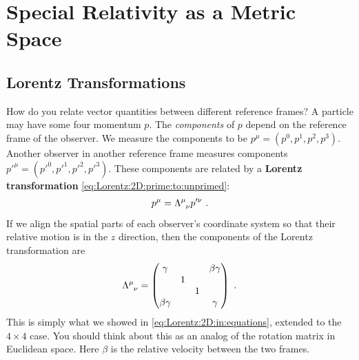 \documentclass[12pt, oneside]{report}    %
\let\oldsection\section
\def\section{%
  \setcounter{sidenote}{1}%
  \oldsection
}
\begin{document}
 




\chapter{Special Relativity as a Metric Space}

\section{Lorentz Transformations}\label{sec:Lorentz:transformations}

How do you relate vector quantities between different reference frames? A particle may have some four momentum $p$. The \emph{components} of $p$ depend on the reference frame of the observer. We measure the components to be $p^\mu = (p^0, p^1, p^2, p^3)$. Another observer in another reference frame measures components $p'^\mu=(p'^0, p'^1, p'^2, p'^3)$. These components are related by a \textbf{Lorentz transformation} \eqref{eq:Lorentz:2D:prime:to:unprimed}:
\begin{align}
    p^\mu = \Lambda\aij{\mu}{\nu}p'^\nu \ .
\end{align}
If we align the spatial parts of each observer's coordinate system so that their relative motion is in the $z$ direction, then the components of the Lorentz transformation are
\begin{align}
    \Lambda\aij{\mu}{\nu} =
    \begin{pmatrix}
        \gamma & & & \beta\gamma\\
        & 1 & &  \\
        & & 1 &  \\
        \beta\gamma &  &  & \gamma
    \end{pmatrix}
    \ . 
    \label{eq:Lorentz:in:z}
\end{align}
This is simply what we showed in \eqref{eq:Lorentz:2D:in:equations}, extended to the $4\times 4$ case. You should think about this as an analog of the rotation matrix in Euclidean space. Here $\beta$ is the relative velocity between the two frames. 
\end{document}
